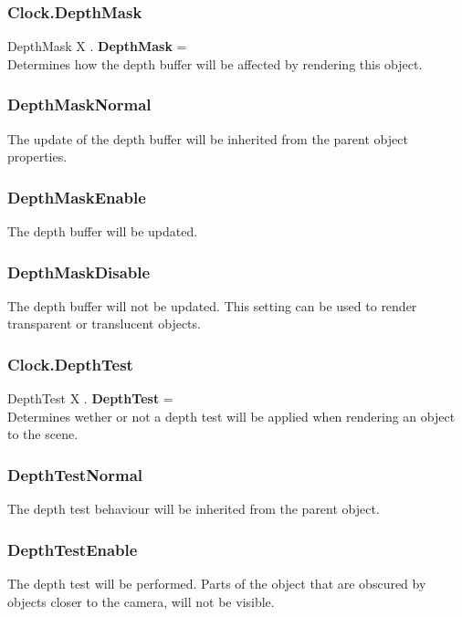 \subsubsection{Clock.DepthMask \label{F:Clock:DepthMask}}
DepthMask X . \textbf{DepthMask} = \\
Determines how the depth buffer will be affected by rendering this object.

\subsubsection{DepthMaskNormal \label{T:DepthMask|DepthMaskNormal}}
The update of the depth buffer will be inherited from the parent object properties.

\subsubsection{DepthMaskEnable \label{T:DepthMask|DepthMaskEnable}}
The depth buffer will be updated.

\subsubsection{DepthMaskDisable \label{T:DepthMask|DepthMaskDisable}}
The depth buffer will not be updated. This setting can be used to render transparent or translucent objects.

\subsubsection{Clock.DepthTest \label{F:Clock:DepthTest}}
DepthTest X . \textbf{DepthTest} = \\
Determines wether or not a depth test will be applied when rendering an object to the scene.

\subsubsection{DepthTestNormal \label{T:DepthTest|DepthTestNormal}}
The depth test behaviour will be inherited from the parent object.

\subsubsection{DepthTestEnable \label{T:DepthTest|DepthTestEnable}}
The depth test will be performed. Parts of the object that are obscured by objects closer to the camera, will not be visible.

